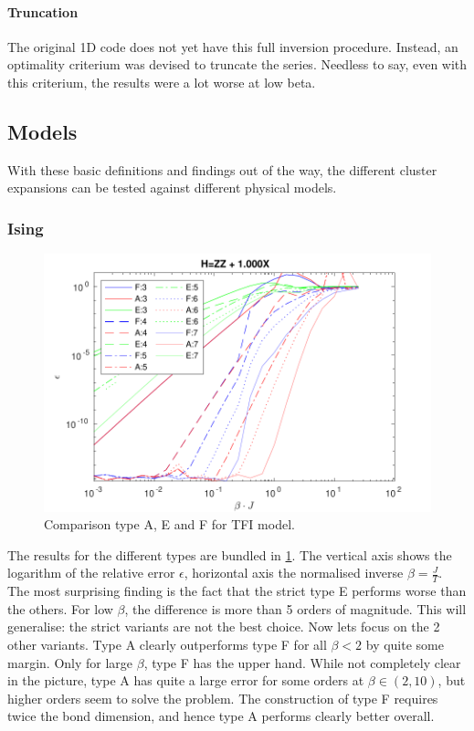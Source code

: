 \paragraph{Truncation}

The original 1D code does not yet have this full inversion procedure. Instead, an optimality criterium was devised to truncate the series. Needless to say, even with this criterium, the results were a lot worse at low beta.

\subsection{Models}

With these basic definitions and findings out of the way, the different cluster expansions can be tested against different physical models.

\subsubsection{Ising}

\begin{figure}[!htbp]
    \center
    \includegraphics[width=\textwidth]{Figuren/benchmarking/t_ising.pdf}
    \caption{Comparison type A, E and F for \Gls{TFI} model. }
    \label{fig:benchmark:tising}
\end{figure}

The results for the different types are bundled in \cref{fig:benchmark:tising}. The vertical axis shows the logarithm of the relative error $\epsilon$, horizontal axis the normalised inverse $\beta= \frac{J}{T}$. The most surprising finding is the fact that the strict type E performs worse than the others. For low $\beta$, the difference is more than 5 orders of magnitude. This will generalise: the strict variants are not the best choice.
Now lets focus on the 2 other variants. Type A clearly outperforms type F for all $\beta<2$ by quite some margin. Only for large $\beta$, type F has the upper hand. While not completely clear in the picture, type A has quite a large error for some orders at $\beta \in (2,10) $, but higher orders seem to solve the problem. The construction of type F requires twice the bond dimension, and hence type A performs clearly better overall.

